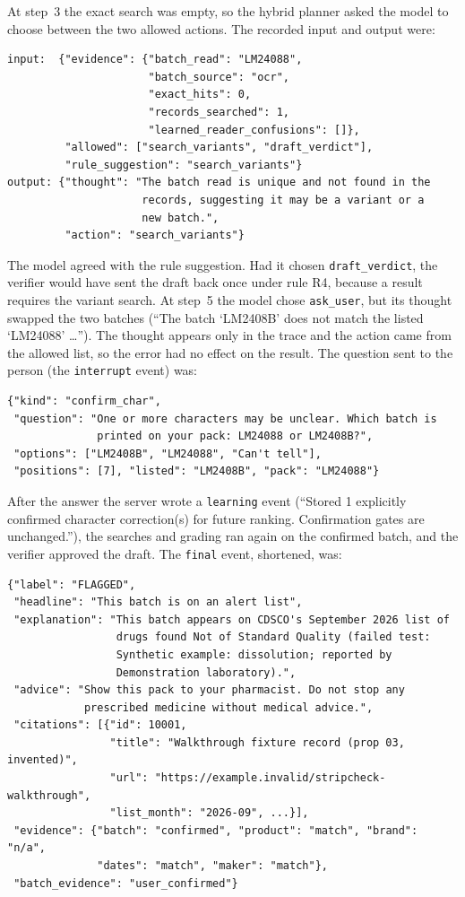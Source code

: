 At step~3 the exact search was empty, so the hybrid planner asked the model to choose between the two allowed actions. The recorded input and output were:
\begin{lstlisting}[language={},numbers=none,caption={Planner decision at branch point (b), Trace~1 (\texttt{docs/trace/README.md})},label={lst:app-branch-b}]
input:  {"evidence": {"batch_read": "LM24088",
                      "batch_source": "ocr",
                      "exact_hits": 0,
                      "records_searched": 1,
                      "learned_reader_confusions": []},
         "allowed": ["search_variants", "draft_verdict"],
         "rule_suggestion": "search_variants"}
output: {"thought": "The batch read is unique and not found in the
                     records, suggesting it may be a variant or a
                     new batch.",
         "action": "search_variants"}
\end{lstlisting}
The model agreed with the rule suggestion. Had it chosen \texttt{draft\_verdict}, the verifier would have sent the draft back once under rule R4, because a \NLISTED{} result requires the variant search. At step~5 the model chose \texttt{ask\_user}, but its thought swapped the two batches (``The batch `LM2408B' does not match the listed `LM24088' \ldots''). The thought appears only in the trace and the action came from the allowed list, so the error had no effect on the result. The question sent to the person (the \texttt{interrupt} event) was:
\begin{lstlisting}[language={},numbers=none]
{"kind": "confirm_char",
 "question": "One or more characters may be unclear. Which batch is
              printed on your pack: LM24088 or LM2408B?",
 "options": ["LM2408B", "LM24088", "Can't tell"],
 "positions": [7], "listed": "LM2408B", "pack": "LM24088"}
\end{lstlisting}
After the answer the server wrote a \texttt{learning} event (``Stored 1 explicitly confirmed character correction(s) for future ranking. Confirmation gates are unchanged.''), the searches and grading ran again on the confirmed batch, and the verifier approved the draft. The \texttt{final} event, shortened, was:
\begin{lstlisting}[language={},numbers=none]
{"label": "FLAGGED",
 "headline": "This batch is on an alert list",
 "explanation": "This batch appears on CDSCO's September 2026 list of
                 drugs found Not of Standard Quality (failed test:
                 Synthetic example: dissolution; reported by
                 Demonstration laboratory).",
 "advice": "Show this pack to your pharmacist. Do not stop any
            prescribed medicine without medical advice.",
 "citations": [{"id": 10001,
                "title": "Walkthrough fixture record (prop 03, invented)",
                "url": "https://example.invalid/stripcheck-walkthrough",
                "list_month": "2026-09", ...}],
 "evidence": {"batch": "confirmed", "product": "match", "brand": "n/a",
              "dates": "match", "maker": "match"},
 "batch_evidence": "user_confirmed"}
\end{lstlisting}
